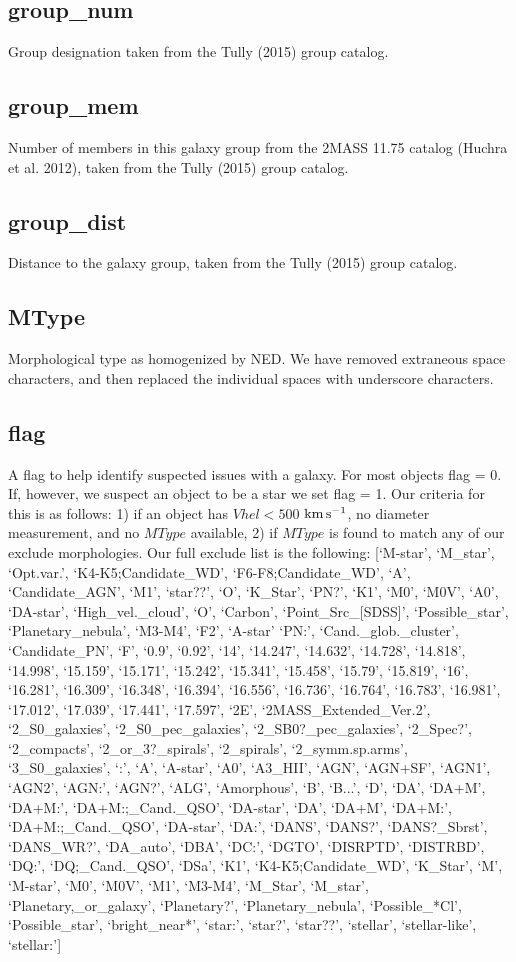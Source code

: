 \documentclass[iop]{emulateapj-rtx4}
\newcommand{\kms}{$\rm km\, s^{-1}$}
\begin{document}
\subsection{group\_num}
Group designation taken from the Tully (2015) group catalog.

\subsection{group\_mem}
Number of members in this galaxy group from the 2MASS 11.75 catalog (Huchra et al. 2012), taken from the Tully (2015) group catalog.

\subsection{group\_dist}
Distance to the galaxy group, taken from the Tully (2015) group catalog.

\subsection{MType}
Morphological type as homogenized by NED. We have removed extraneous space characters, and then replaced the individual spaces with underscore characters.

\subsection{flag}
A flag to help identify suspected issues with a galaxy. For most objects flag = 0. If, however, we suspect an object to be a star we set flag = 1. Our criteria for this is as follows: 1) if an object has $Vhel < 500$ \kms, no diameter measurement, and no $MType$ available, 2) if $MType$ is found to match any of our exclude morphologies. Our full exclude list is the following: [`M-star', `M_star', `Opt.var.', `K4-K5;Candidate_WD', `F6-F8;Candidate_WD', `A', `Candidate_AGN', `M1', `star??', `O', `K_Star', `PN?', `K1', `M0', `M0V', `A0', `DA-star', `High_vel._cloud', `O', `Carbon', `Point_Src_[SDSS]', `Possible_star', `Planetary_nebula', `M3-M4', `F2', `A-star' `PN:', `Cand._glob._cluster', `Candidate_PN', `F', `0.9', `0.92', `14', `14.247', `14.632', `14.728', `14.818', `14.998', `15.159', `15.171', `15.242', `15.341', `15.458', `15.79', `15.819', `16', `16.281', `16.309', `16.348', `16.394', `16.556', `16.736', `16.764', `16.783', `16.981', `17.012', `17.039', `17.441', `17.597', `2E', `2MASS_Extended_Ver.2', `2_S0_galaxies', `2_S0_pec_galaxies', `2_SB0?_pec_galaxies', `2_Spec?', `2_compacts', `2_or_3?_spirals', `2_spirals', `2_symm.sp.arms', `3_S0_galaxies', `:', `A', `A-star', `A0', `A3_HII', `AGN', `AGN+SF', `AGN1', `AGN2', `AGN:', `AGN?', `ALG', `Amorphous', `B', `B...', `D', `DA', `DA+M', `DA+M:', `DA+M:;_Cand._QSO', `DA-star', `DA', `DA+M', `DA+M:', `DA+M:;_Cand._QSO', `DA-star', `DA:', `DANS', `DANS?', `DANS?_Sbrst', `DANS_WR?', `DA_auto', `DBA', `DC:', `DGTO', `DISRPTD', `DISTRBD', `DQ:', `DQ;_Cand._QSO', `DSa', `K1', `K4-K5;Candidate_WD', `K_Star', `M', `M-star', `M0', `M0V', `M1', `M3-M4', `M_Star', `M_star', `Planetary,_or_galaxy', `Planetary?', `Planetary_nebula', `Possible_*Cl', `Possible_star', `bright_near*', `star:', `star?', `star??', `stellar', `stellar-like', `stellar:']
\end{document}
